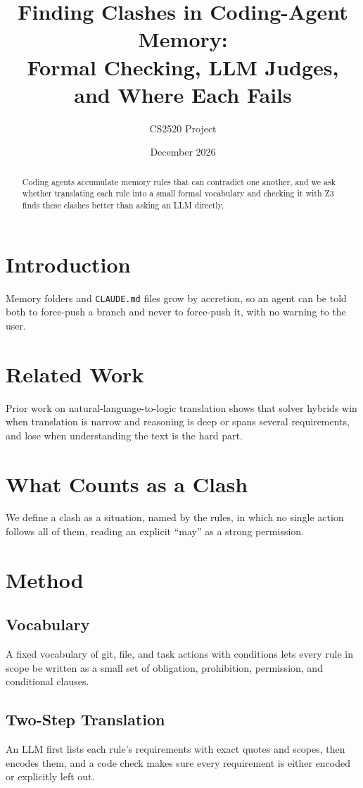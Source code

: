 \documentclass[11pt]{article}
\title{Finding Clashes in Coding-Agent Memory:\\Formal Checking, LLM Judges, and Where Each Fails}
\author{CS2520 Project}
\date{December 2026}
\begin{document}
\maketitle


\begin{abstract}
Coding agents accumulate memory rules that can contradict one another, and we ask whether
translating each rule into a small formal vocabulary and checking it with Z3 finds these
clashes better than asking an LLM directly.
\end{abstract}

\section{Introduction}
Memory folders and \texttt{CLAUDE.md} files grow by accretion, so an agent can be told both to
force-push a branch and never to force-push it, with no warning to the user.

\section{Related Work}
Prior work on natural-language-to-logic translation shows that solver hybrids win when
translation is narrow and reasoning is deep or spans several requirements, and lose when
understanding the text is the hard part.

\section{What Counts as a Clash}
We define a clash as a situation, named by the rules, in which no single action follows all of
them, reading an explicit ``may'' as a strong permission.

\section{Method}
\subsection{Vocabulary}
A fixed vocabulary of git, file, and task actions with conditions lets every rule in scope be
written as a small set of obligation, prohibition, permission, and conditional clauses.
\subsection{Two-Step Translation}
An LLM first lists each rule's requirements with exact quotes and scopes, then encodes them,
and a code check makes sure every requirement is either encoded or explicitly left out.
\end{document}
